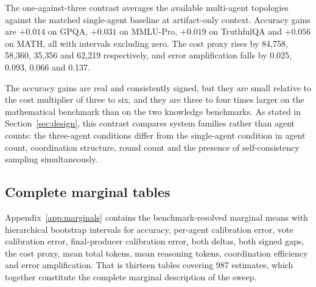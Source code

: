 The one-against-three contrast averages the available multi-agent topologies against the
matched single-agent baseline at artifact-only context. Accuracy gains are $+0.014$ on
GPQA, $+0.031$ on MMLU-Pro, $+0.019$ on TruthfulQA and $+0.056$ on MATH, all with
intervals excluding zero. The cost proxy rises by 84{,}758, 58{,}360, 35{,}356 and 62{,}219
respectively, and error amplification falls by 0.025, 0.093, 0.066 and 0.137.

The accuracy gains are real and consistently signed, but they are small relative to the
cost multiplier of three to six, and they are three to four times larger on the
mathematical benchmark than on the two knowledge benchmarks. As stated in
Section~\ref{sec:design}, this contrast compares system families rather than agent counts:
the three-agent conditions differ from the single-agent condition in agent count,
coordination structure, round count and the presence of self-consistency sampling
simultaneously.

\subsection{Complete marginal tables}

Appendix~\ref{app:marginals} contains the benchmark-resolved marginal means with
hierarchical bootstrap intervals for accuracy, per-agent calibration error, vote
calibration error, final-producer calibration error, both deltas, both signed gaps, the
cost proxy, mean total tokens, mean reasoning tokens, coordination efficiency and error
amplification. That is thirteen tables covering 987 estimates, which together constitute
the complete marginal description of the sweep.
